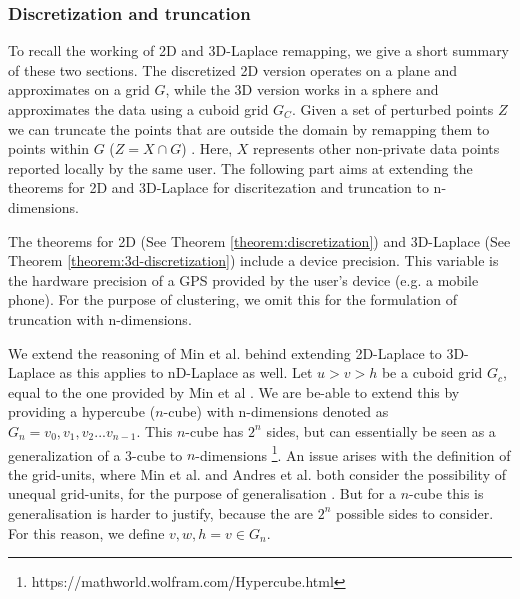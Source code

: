 \subsubsection{Discretization and truncation} \label{theory:nd-laplace-truncation}
To recall the working of 2D and 3D-Laplace remapping, we give a short summary of these two sections. The discretized 2D version operates on a plane and approximates on a grid $G$, while the 3D version works in a sphere and approximates the data using a cuboid grid  $G_C$.
Given a set of perturbed points $Z$ we can truncate the points that are outside the domain by remapping them to points within $G$ ($Z = X \cap G$) \citep{DBLP:journals/corr/abs-1212-1984}.
Here, $X$ represents other non-private data points reported locally by the same user.
The following part aims at extending the theorems for 2D and 3D-Laplace for discritezation and truncation to n-dimensions. \newline

The theorems for 2D (See Theorem \ref{theorem:discretization}) and 3D-Laplace (See Theorem \ref{theorem:3d-discretization}) include a device precision. 
This variable is the hardware precision of a GPS provided by the user's device (e.g. a mobile phone). 
For the purpose of clustering, we omit this for the formulation of truncation with n-dimensions.

We extend the reasoning of Min et al. behind extending 2D-Laplace to 3D-Laplace as this applies to nD-Laplace as well.
Let $u > v > h$ be a cuboid grid $G_c$, equal to the one provided by Min et al \citep{9646489}.
We are be-able to extend this by providing a hypercube ($n$-cube) with n-dimensions denoted as $G_n = v_0, v_1, v_2 ... v_{n-1}$. This $n$-cube has $2^n$ sides, but can essentially be seen as a generalization of a 3-cube to $n$-dimensions \footnote{https://mathworld.wolfram.com/Hypercube.html}.
An issue arises with the definition of the grid-units, where Min et al. and Andres et al. both consider the possibility of unequal grid-units, for the purpose of generalisation \citep{9646489, DBLP:journals/corr/abs-1212-1984}. 
But for a $n$-cube this is generalisation is harder to justify, because the are $2^n$ possible sides to consider.
For this reason, we define $v, w, h = v \in G_n$.

